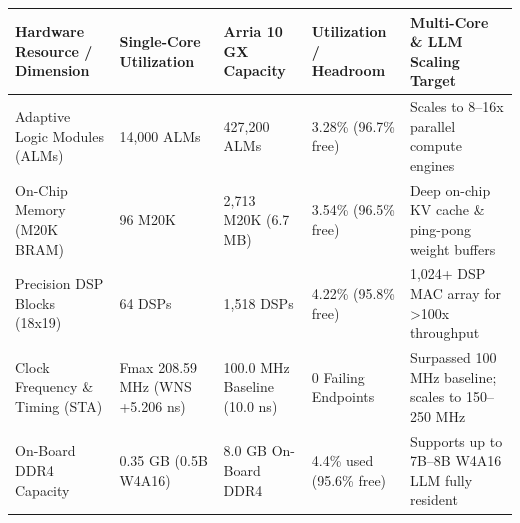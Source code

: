 \documentclass[11pt,a4paper]{article}
\begin{document}
{\footnotesize\renewcommand{\arraystretch}{1.14}\begin{longtable}{@{}L{0.21\textwidth}L{0.16\textwidth}L{0.16\textwidth}L{0.15\textwidth}L{0.22\textwidth}@{}}\toprule

\textbf{Hardware Resource /\allowbreak{} Dimension} & \textbf{Single-Core Utilization} & \textbf{Arria 10 GX Capacity} & \textbf{Utilization /\allowbreak{} Headroom} & \textbf{Multi-Core \& LLM Scaling Target}\\\midrule\endhead

Adaptive Logic Modules (\allowbreak{}ALMs)\allowbreak{} & 14,\allowbreak{}000 ALMs & 427,\allowbreak{}200 ALMs & 3.28\% (\allowbreak{}96.7\% free)\allowbreak{} & Scales to 8--16x parallel compute engines\\[2pt]

On-Chip Memory (\allowbreak{}M20K BRAM)\allowbreak{} & 96 M20K & 2,\allowbreak{}713 M20K (\allowbreak{}6.7 MB)\allowbreak{} & 3.54\% (\allowbreak{}96.5\% free)\allowbreak{} & Deep on-chip KV cache \& ping-pong weight buffers\\[2pt]

Precision DSP Blocks (\allowbreak{}18x19)\allowbreak{} & 64 DSPs & 1,\allowbreak{}518 DSPs & 4.22\% (\allowbreak{}95.8\% free)\allowbreak{} & 1,\allowbreak{}024+\allowbreak{} DSP MAC array for >100x throughput\\[2pt]

Clock Frequency \& Timing (\allowbreak{}STA)\allowbreak{} & Fmax 208.59 MHz (\allowbreak{}WNS +\allowbreak{}5.206 ns)\allowbreak{} & 100.0 MHz Baseline (\allowbreak{}10.0 ns)\allowbreak{} & 0 Failing Endpoints & Surpassed 100 MHz baseline; scales to 150--250 MHz\\[2pt]

On-Board DDR4 Capacity & 0.35 GB (\allowbreak{}0.5B W4A16)\allowbreak{} & 8.0 GB On-Board DDR4 & 4.4\% used (\allowbreak{}95.6\% free)\allowbreak{} & Supports up to 7B--8B W4A16 LLM fully resident\\[2pt]

\bottomrule\end{longtable}}
\end{document}
